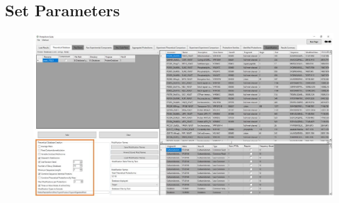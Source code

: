 \subsection{Set Parameters}
\begin{figure}[h]
\centering
\includegraphics[scale=0.43]{figures/theoretical1.jpg}
\end{figure}
